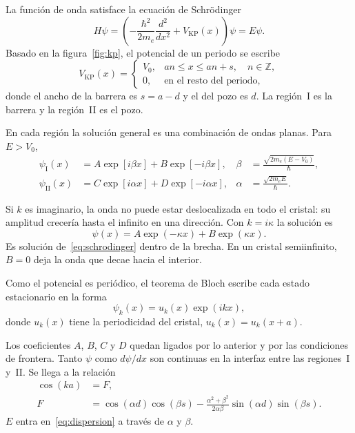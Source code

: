 \documentclass[reprint, amsmath, amssymb, aps, prb]{revtex4-2}
\begin{document}
La función de onda satisface la ecuación de Schrödinger
\begin{equation}
H\psi=
\left(-\frac{\hbar^2}{2m_e}\frac{d^2}{dx^2}+V_{\mathrm{KP}}(x)\right)\psi
=E\psi.
\label{eq:schrodinger}
\end{equation}
Basado en la figura~\ref{fig:kp}, el potencial de un periodo se escribe
\begin{equation}
V_{\mathrm{KP}}(x)=
\begin{cases}
V_0, & an \leq x \leq an+s, \quad n\in\mathbb{Z},\\
0, & \text{en el resto del periodo,}
\end{cases}
\label{eq:potencial}
\end{equation}
donde el ancho de la barrera es $s=a-d$ y el del pozo es $d$. La región~I es la barrera y la región~II es el pozo.

En cada región la solución general es una combinación de ondas planas. Para $E>V_0$,
\begin{equation}
\begin{aligned}
\psi_{\mathrm{I}}(x)
&=A\exp[i\beta x]+B\exp[-i\beta x],
&\beta&=\frac{\sqrt{2m_e(E-V_0)}}{\hbar},\\[4pt]
\psi_{\mathrm{II}}(x)
&=C\exp[i\alpha x]+D\exp[-i\alpha x],
&\alpha&=\frac{\sqrt{2m_e E}}{\hbar}.
\end{aligned}
\label{eq:ondas}
\end{equation}


Si $k$ es imaginario, la onda no puede estar deslocalizada en todo el cristal: su amplitud crecería hasta el infinito en una dirección. Con $k=i\kappa$ la solución es
\begin{equation}
\label{eqn:imagkfunc}
\psi(x)=A\exp(-\kappa x)+B\exp(\kappa x).
\end{equation}
Es solución de~\eqref{eq:schrodinger} dentro de la brecha. En un cristal semiinfinito, $B=0$ deja la onda que decae hacia el interior. 

Como el potencial es periódico, el teorema de Bloch escribe cada estado estacionario en la forma
\begin{equation}
\psi_k(x)=u_k(x)\exp(ikx),
\label{eq:bloch}
\end{equation}
donde $u_k(x)$ tiene la periodicidad del cristal, $u_k(x)=u_k(x+a)$.

Los coeficientes $A$, $B$, $C$ y $D$ quedan ligados por lo anterior y por las condiciones de frontera. Tanto $\psi$ como $d\psi/dx$ son continuas en la interfaz entre las regiones~I y~II. Se llega a la relación
\begin{equation}
\begin{aligned}
\cos(ka)&=F,\\
F&=\cos(\alpha d)\cos(\beta s)
-\frac{\alpha^2+\beta^2}{2\alpha\beta}\sin(\alpha d)\sin(\beta s).
\end{aligned}
\label{eq:dispersion}
\end{equation}
$E$ entra en~\eqref{eq:dispersion} a través de $\alpha$ y $\beta$.
\end{document}
